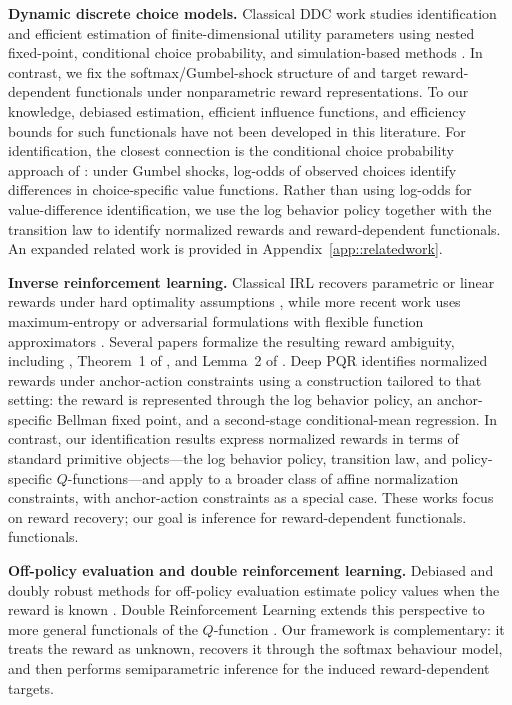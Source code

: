 \documentclass[12pt]{article}
\theoremstyle{plain}
\begin{document}
\noindent \textbf{Dynamic discrete choice models.}
Classical DDC work studies identification and efficient estimation of
finite-dimensional utility parameters using nested fixed-point, conditional
choice probability, and simulation-based methods
\citep{rust1987optimal,hotz1993conditional,hotz1994simulation,aguirregabiria2010dynamic}.
In contrast, we fix the softmax/Gumbel-shock structure of
\citet{rust1987optimal} and target reward-dependent functionals under
nonparametric reward representations. To our knowledge, debiased estimation,
efficient influence functions, and efficiency bounds for such functionals have
not been developed in this literature. For identification, the closest
connection is the conditional choice probability approach of
\citet{hotz1993conditional}: under Gumbel shocks, log-odds of observed choices
identify differences in choice-specific value functions. Rather than using
log-odds for value-difference identification, we use the log behavior policy
together with the transition law to identify normalized rewards and
reward-dependent functionals. An expanded related work is provided in Appendix~\ref{app::relatedwork}.

\noindent \textbf{Inverse reinforcement learning.}
Classical IRL recovers parametric or linear rewards under hard optimality
assumptions \citep[e.g.][]{ng2000algorithms,abbeel2004apprenticeship}, while
more recent work uses maximum-entropy or adversarial formulations with flexible
function approximators
\citep[e.g.][]{ziebart2008maximum,ziebart2010modeling,levine2011nonlinear,ho2016gail,fu2018airl,geng2020deep}.
Several papers formalize the resulting reward ambiguity, including
\citet{fu2018airl}, Theorem~1 of \citet{cao2021identifiability}, and Lemma~2 of
\citet{geng2020deep}. Deep PQR \citep{geng2020deep} identifies normalized
rewards under anchor-action constraints using a construction tailored to that
setting: the reward is represented through the log behavior policy, an
anchor-specific Bellman fixed point, and a second-stage conditional-mean
regression. In contrast, our identification results express normalized rewards
in terms of standard primitive objects---the log behavior policy, transition
law, and policy-specific \(Q\)-functions---and apply to a broader class of
affine normalization constraints, with anchor-action constraints as a special
case. These works focus on reward recovery; our goal is inference for
reward-dependent functionals.
functionals.

\noindent \textbf{Off-policy evaluation and double reinforcement learning.}
Debiased and doubly robust methods for off-policy evaluation estimate policy
values when the reward is known
\citep[e.g.][]{jiang2016doubly,thomas2016data,tang2019doubly,
liu2018breaking,van2018online,kallus2020double,uehara2020minimax,shi2021deeply,
kallus2022efficiently,mehrabi2024off}.
Double Reinforcement Learning extends this perspective to more general
functionals of the \(Q\)-function \citep{kallus2020double,kallus2022efficiently,van2025automaticDRL}.
Our framework is complementary: it treats the reward as unknown, recovers it
through the softmax behaviour model, and then performs semiparametric inference
for the induced reward-dependent targets.  
\end{document}
